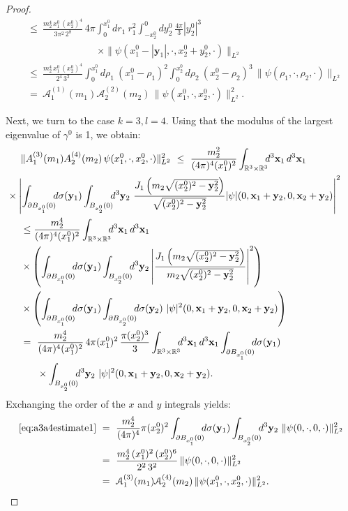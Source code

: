 \documentclass[b5paper,draft,openbib,12pt]{memoir}
\newcommand{\R}{\mathbb{R}}
\newcommand{\vx}{\mathbf{x}}
\newcommand{\vy}{\mathbf{y}}
\begin{document}
\begin{proof}
\begin{align}
&\leq~  \frac{m_2^4 \, x_1^0\,  (x_2^0)^4}{3 \pi^2\, 2^8 } \, 4\pi \int_{0}^{x_1^0} \!\!\! d r_1 ~r_1^2 \int_{-x_2^0}^0 dy_2^0 ~\frac{4\pi}{3} |y_2^0|^3 \\\nonumber
&\hspace{3cm}\times \| \psi(x_1^0 - |\vy_1|,\cdot,x_2^0 + y_2^0,\cdot)\|_{L^2} \nonumber\\
&\leq~  \frac{m_2^4 \, x_1^0 \,  (x_2^0)^4}{2^4 \, 3^2} \int_{0}^{x_1^0} \!\!\! d \rho_1 ~(x_1^0-\rho_1)^2 \int_{0}^{x_2^0} d\rho_2 ~(x_2^0-\rho_2)^3 \, \| \psi(\rho_1,\cdot,\rho_2,\cdot)\|_{L^2} \nonumber\\
&=~ \mathcal{A}_1^{(1)}(m_1) \mathcal{A}_2^{(2)}(m_2)\, \|\psi(x_1^0,\cdot,x_2^0,\cdot)\|^2_{L^2}.
\end{align}

Next, we turn to the case $k=3, l=4$. Using that the modulus of the 
largest eigenvalue of $\gamma^0$ is 1, we obtain:
\begin{align}
	&\| A_1^{(3)}(m_1) A_2^{(4)}(m_2)\, \psi(x^0_1,\cdot,x_2^0,\cdot) \|^2_{L^2} ~\leq~ \frac{m_2^2}{(4\pi)^4 (x_1^0)^2} \int_{\R^3\times \R^3} \!\!\! d^3 \vx_1 \, d^3 \vx_1\nonumber\\
 &\hspace{-0.5cm}\times \left|\int_{\partial B_{x_1^0}(0)} \!\!\! d \sigma(\vy_1) \int_{B_{x_2^0}(0)} \!\!\! d^3 \vy_2 ~\frac{J_1\left( m_2\sqrt{(x_2^0)^2-\vy_2^2}\right)}{\sqrt{(x_2^0)^2-\vy_2^2}} |\psi|(0,\vx_1+\vy_2,0,\vx_2+\vy_2) \right|^2\nonumber\\
&\leq \frac{m_2^4}{(4\pi)^4 (x_1^0)^2} \int_{\R^3\times \R^3} \!\!\! d^3 \vx_1 \, d^3 \vx_1\nonumber\\
& \times\left(\int_{\partial B_{x_1^0}(0)} \!\!\! d \sigma(\vy_1) \int_{B_{x_2^0}(0)} \!\!\! d^3 \vy_2 \left|\frac{J_1\left( m_2\sqrt{(x_2^0)^2-\vy_2^2}\right)}{m_2\sqrt{(x_2^0)^2-\vy_2^2}}\right|^2 \right)\nonumber\\
& \times \left( \int_{\partial B_{x_1^0}(0)} \!\!\! d \sigma(\vy_1) \int_{\partial B_{x_2^0}(0)} \!\!\! d \sigma(\vy_2) ~|\psi|^2(0,\vx_1+\vy_2,0,\vx_2+\vy_2)\right)\nonumber\\
&=~ \frac{m_2^4}{(4\pi)^4 (x_1^0)^2} \, 4\pi (x_1^0)^2 \, \frac{\pi (x_2^0)^3}{3} \int_{\R^3\times \R^3} \!\!\! d^3 \vx_1 \, d^3 \vx_1 \int_{\partial B_{x_1^0}(0)} \!\!\! d \sigma(\vy_1)  \nonumber\\
&~~~~~\times\int_{B_{x_2^0}(0)} \!\!\! d^3 \vy_2 ~|\psi|^2(0,\vx_1+\vy_2,0,\vx_2+\vy_2).
\label{eq:a3a4estimate1}
\end{align}
Exchanging the order of the $x$ and $y$ integrals yields:
\begin{align}
	\eqref{eq:a3a4estimate1} ~&=~ \frac{m_2^4}{(4\pi)^4} \pi (x_2^0)^2\int_{\partial B_{x_1^0}(0)} \!\!\! d \sigma(\vy_1) \int_{B_{x_2^0}(0)} \!\!\! d^3 \vy_2 ~\|\psi(0,\cdot,0,\cdot)\|^2_{L^2}\nonumber\\
&=~ \frac{m_2^4 \, (x_1^0)^2 \, (x_2^0)^6}{2^2 \, 3^2} \, \|\psi(0,\cdot,0,\cdot)\|^2_{L^2}\nonumber\\
&= ~ \mathcal{A}_1^{(3)}(m_1) \mathcal{A}_2^{(4)}(m_2) \,  \|\psi(x_1^0,\cdot,x_2^0,\cdot)\|^2_{L^2}.
\end{align} 
\end{proof}
\end{document}
